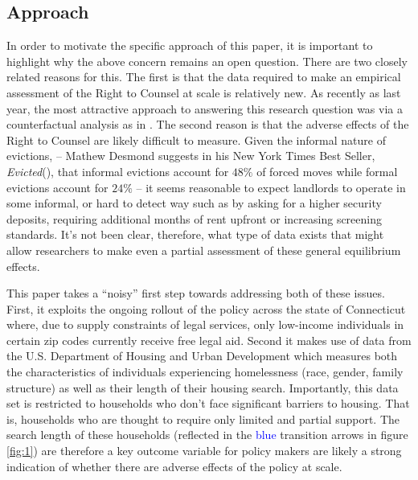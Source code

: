 \documentclass[a4paper,12pt]{article}
\begin{document}
\subsection{Approach}
In order to motivate the specific approach of this paper, it is important to highlight why the above concern remains an open question. There are two closely related reasons for this. The first is that the data required to make an empirical assessment of the Right to Counsel at scale is relatively new. As recently as last year, the most attractive approach to answering this research question was via a counterfactual analysis as in \cite{abramson2021welfare}. The second reason is that the adverse effects of the Right to Counsel are likely difficult to measure. Given the informal nature of evictions, -- Mathew Desmond suggests in his New York Times Best Seller, \textit{Evicted}(\cite{desmond2016evicted}), that informal evictions account for $48\%$ of forced moves while formal evictions account for $24\%$ -- it seems reasonable to expect landlords to operate in some informal, or hard to detect way such as by asking for a higher security deposits, requiring additional months of rent upfront or increasing screening standards. It's not been clear, therefore, what type of data exists that might allow researchers to make even a partial assessment of these general equilibrium effects. \par 
This paper takes a ``noisy'' first step towards addressing both of these issues. First, it exploits the ongoing rollout of the policy across the state of Connecticut where, due to supply constraints of legal services, only low-income individuals in certain zip codes currently receive free legal aid. Second it makes use of data from the U.S. Department of Housing and Urban Development which measures both the characteristics of individuals experiencing homelessness (race, gender, family structure) as well as their length of their housing search. Importantly, this data set is restricted to households who don't face significant barriers to housing. That is, households who are thought to require only limited and partial support. The search length of these households (reflected in the \textcolor{blue}{blue} transition arrows in figure \ref{fig:1}) are therefore a key outcome variable for policy makers are likely a strong indication of whether there are adverse effects of the policy at scale. 
\end{document}
